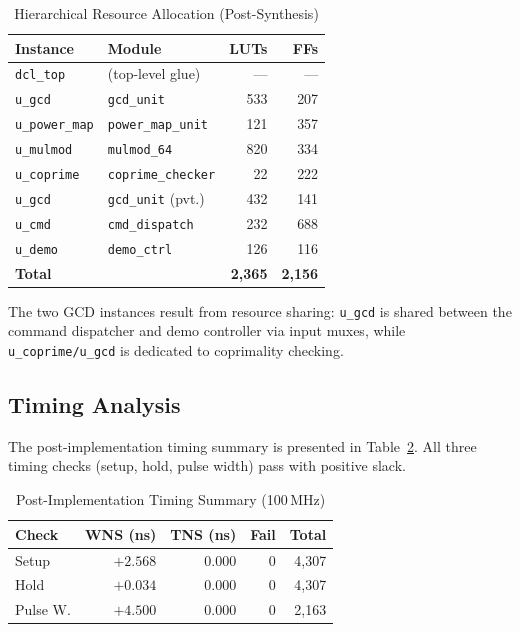\documentclass[lettersize,journal]{IEEEtran}
\begin{document}
\begin{table}[!t]
\caption{Hierarchical Resource Allocation (Post-Synthesis)\label{tab:hier}}
\centering
\begin{tabular}{@{}llrr@{}}
\toprule
\textbf{Instance} & \textbf{Module} & \textbf{LUTs} & \textbf{FFs} \\
\midrule
\texttt{dcl\_top}           & (top-level glue) & ---   & --- \\
\quad \texttt{u\_gcd}       & \texttt{gcd\_unit}         & 533  & 207 \\
\quad \texttt{u\_power\_map}& \texttt{power\_map\_unit}  & 121  & 357 \\
\quad\quad \texttt{u\_mulmod}& \texttt{mulmod\_64}       & 820  & 334 \\
\quad \texttt{u\_coprime}   & \texttt{coprime\_checker}  & 22   & 222 \\
\quad\quad \texttt{u\_gcd}  & \texttt{gcd\_unit} (pvt.)  & 432  & 141 \\
\quad \texttt{u\_cmd}       & \texttt{cmd\_dispatch}     & 232  & 688 \\
\quad \texttt{u\_demo}      & \texttt{demo\_ctrl}        & 126  & 116 \\
\midrule
\textbf{Total}              &                            & \textbf{2{,}365} & \textbf{2{,}156} \\
\bottomrule
\end{tabular}
\vspace{0.5em}
\footnotesize The two GCD instances result from resource sharing: \texttt{u\_gcd} is shared between the command dispatcher and demo controller via input muxes, while \texttt{u\_coprime/u\_gcd} is dedicated to coprimality checking.
\end{table}

\subsection{Timing Analysis}

The post-implementation timing summary is presented in Table~\ref{tab:timing}. All three timing checks (setup, hold, pulse width) pass with positive slack.

\begin{table}[!t]
\caption{Post-Implementation Timing Summary (100\,MHz)\label{tab:timing}}
\centering
\begin{tabular}{@{}lrrrr@{}}
\toprule
\textbf{Check} & \textbf{WNS (ns)} & \textbf{TNS (ns)} & \textbf{Fail} & \textbf{Total} \\
\midrule
Setup    & $+2.568$ & 0.000 & 0 & 4{,}307 \\
Hold     & $+0.034$ & 0.000 & 0 & 4{,}307 \\
Pulse W. & $+4.500$ & 0.000 & 0 & 2{,}163 \\
\bottomrule
\end{tabular}
\end{table}
\end{document}
